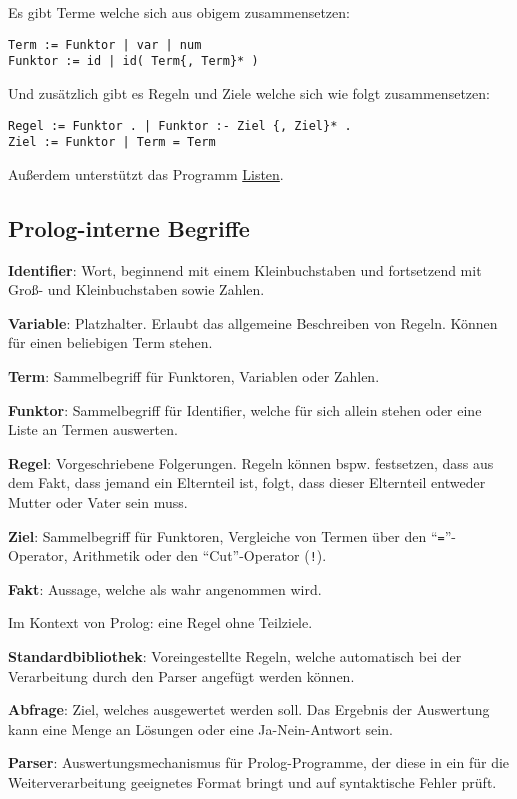 \documentclass[parskip=full,11pt,twoside]{scrartcl}
\begin{document}
Es gibt Terme welche sich aus obigem zusammensetzen:

\begin{lstlisting}
Term := Funktor | var | num
Funktor := id | id( Term{, Term}* )
\end{lstlisting}

Und zusätzlich gibt es Regeln und Ziele welche sich wie folgt zusammensetzen:

\begin{lstlisting}
Regel := Funktor . | Funktor :- Ziel {, Ziel}* .
Ziel := Funktor | Term = Term
\end{lstlisting}

Außerdem unterstützt das Programm \hyperref[list]{Listen}.

\subsection{Prolog-interne Begriffe}

\textbf{Identifier}:
Wort, beginnend mit einem Kleinbuchstaben und fortsetzend mit Groß- und Kleinbuchstaben sowie Zahlen.

\textbf{Variable}:
Platzhalter. Erlaubt das allgemeine Beschreiben von Regeln. Können für einen beliebigen Term stehen.

\textbf{Term}:
Sammelbegriff für Funktoren, Variablen oder Zahlen.

\textbf{Funktor}:
Sammelbegriff für Identifier, welche für sich allein stehen oder eine Liste an Termen auswerten.

\textbf{Regel}:
Vorgeschriebene Folgerungen. Regeln können bspw. festsetzen, dass aus dem Fakt, dass jemand ein Elternteil ist, folgt, dass dieser Elternteil entweder Mutter oder Vater sein muss.

\textbf{Ziel}:
Sammelbegriff für Funktoren, Vergleiche von Termen über den \enquote{\texttt{=}}-Operator, Arithmetik oder den \enquote{Cut}-Operator (\texttt{!}).

\textbf{Fakt}:
Aussage, welche als wahr angenommen wird.

Im Kontext von Prolog: eine Regel ohne Teilziele.

\textbf{Standardbibliothek}:
Voreingestellte Regeln, welche automatisch bei der Verarbeitung durch den Parser angefügt werden können.

\textbf{Abfrage}:
Ziel, welches ausgewertet werden soll. Das Ergebnis der Auswertung kann eine Menge an Lösungen oder eine Ja-Nein-Antwort sein.

\textbf{Parser}:
Auswertungsmechanismus für Prolog-Programme, der diese in ein für die Weiterverarbeitung geeignetes Format bringt und auf syntaktische Fehler prüft.
\end{document}
